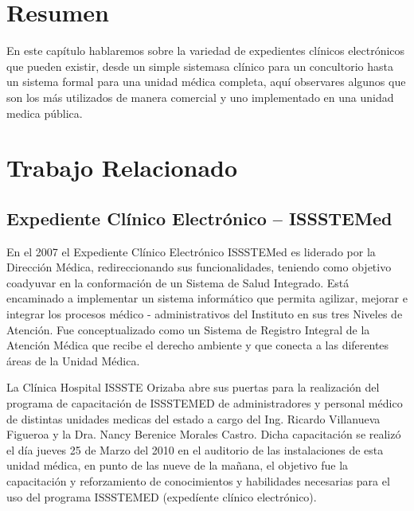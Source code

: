 \chapter*{Resumen}
En este capítulo hablaremos sobre la variedad de expedientes clínicos electrónicos que pueden existir, desde un simple sistemasa clínico para un concultorio hasta un sistema formal para una unidad médica completa, aquí observares algunos que son los más utilizados de manera comercial y uno implementado en una unidad medica pública.

\chapter{Trabajo Relacionado}
\section{Expediente Clínico Electrónico – ISSSTEMed}

En el 2007 el Expediente Clínico Electrónico ISSSTEMed es liderado por la Dirección Médica, redireccionando sus funcionalidades, teniendo como objetivo coadyuvar en la conformación de un Sistema de Salud Integrado. Está encaminado a implementar un sistema informático que permita agilizar, mejorar e integrar los procesos médico - administrativos del Instituto en sus tres Niveles de Atención. Fue conceptualizado como un Sistema de Registro Integral de la Atención Médica que recibe el derecho ambiente y que conecta a las diferentes áreas de la Unidad Médica. \cite{ISSTE}

La Clínica Hospital ISSSTE Orizaba abre sus puertas para la realización del programa de capacitación de ISSSTEMED de administradores y personal médico de distintas unidades medicas del estado a cargo del Ing. Ricardo Villanueva Figueroa y la Dra. Nancy Berenice Morales Castro.
Dicha capacitación se realizó el día  jueves 25 de Marzo del 2010 en el auditorio de las instalaciones de esta unidad médica, en punto de las nueve de la mañana, el objetivo fue la capacitación y reforzamiento de conocimientos y habilidades necesarias para el uso del programa ISSSTEMED (expedíente clínico electrónico).\cite{ISSTE2}

